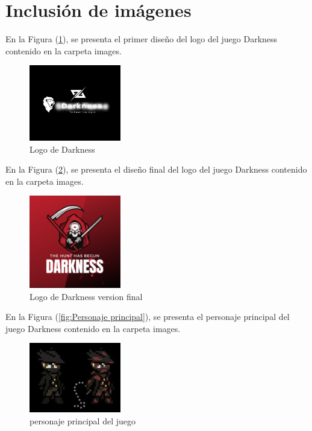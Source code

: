 \documentclass{article}
\begin{document}
\section{Inclusión de imágenes} \label{imagenes}

En la Figura (\ref{fig:Darkness}), se presenta el primer diseño del logo del juego Darkness contenido en la carpeta images.

\begin{figure}[h]
\includegraphics[width=4cm]{Darkness.PNG}
\centering
\caption{Logo de Darkness}
\label{fig:Darkness}
\end{figure}

En la Figura (\ref{fig:darkness logo}), se presenta el diseño final del logo del juego Darkness contenido en la carpeta images.

\begin{figure}[h]
\includegraphics[width=4cm]{darkness logo.png}
\centering
\caption{Logo de Darkness version final}
\label{fig:darkness logo}
\end{figure}


En la Figura (\ref{fig:Personaje principal}), se presenta el personaje principal del juego Darkness contenido en la carpeta images.

\begin{figure}[h]
\includegraphics[width=4cm]{personaje principal.png}
\centering
\caption{personaje principal del juego}
\label{fig:personaje principal}
\end{figure}


\end{document}
